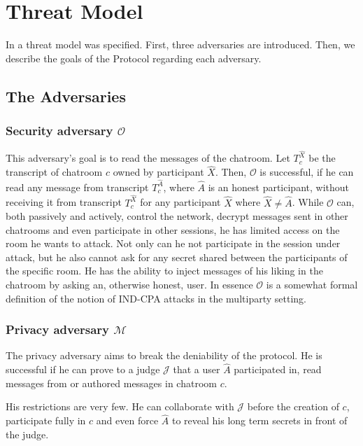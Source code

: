 \chapter{Threat Model}
\label{chapters:ThreatModel}

\newcommand{\secadv}{$\mathcal{O}$ }
\newcommand{\privadv}{$\mathcal{M}$ }
\newcommand{\conadv}{$\mathcal{T}$ }

In \cite{mpotr} a threat model was specified. First, three adversaries are introduced. Then, we describe the goals of the Protocol regarding each adversary.

\section{The Adversaries}

\subsection{Security adversary $\mathcal{O}$}
This adversary's goal is to read the messages of the chatroom.
Let $T_c^{\hat{X}}$ be the transcript of chatroom $c$ owned by participant $\hat{X}$.
Then, $\mathcal{O}$ is successful, if he can read any message from transcript $T_c^{\hat{A}}$, where $\hat{A}$ is an honest participant, without receiving it from transcript $T_c^{\hat{X}}$ for any participant $\hat{X}$ where $\hat{X} \ne \hat{A}$.
While $\mathcal{O}$ can, both passively and actively, control the network, decrypt messages sent in other chatrooms and even participate in other sessions, he has limited access on the room he wants to attack.
Not only can he not participate in the session under attack, but he also cannot ask for any secret shared between the participants of the specific room.
He has the ability to inject messages of his liking in the chatroom by asking an, otherwise honest, user.
In essence $\mathcal{O}$ is a somewhat formal definition of the notion of IND-CPA attacks in the multiparty setting.

\subsection{Privacy adversary $\mathcal{M}$}

The privacy adversary aims to break the deniability of the protocol.
He is successful if he can prove to a judge $\mathcal{J}$ that a user $\hat{A}$ participated in, read messages from or authored messages in chatroom $c$.

His restrictions are very few.
He can collaborate with $\mathcal{J}$ before the creation of $c$, participate fully in $c$ and even force $\hat{A}$ to reveal his long term secrets in front of the judge.

